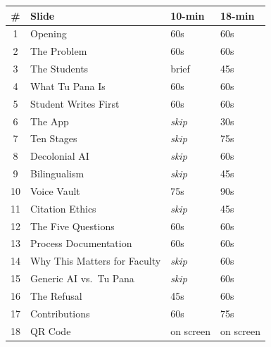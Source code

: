 \documentclass[12pt, letterpaper]{article}
\begin{document}
\vspace{1.5em}
\noindent{\color{tpborder}\rule{\linewidth}{0.5pt}}

\vspace{1.2em}
\vspace{0.5em}

{\small\color{tpdark}
\renewcommand{\arraystretch}{1.35}
\begin{tabular}{clll}
  \color{tpmuted}\textbf{\#} &
  \color{tpmuted}\textbf{Slide} &
  \color{tpmuted}\textbf{10-min} &
  \color{tpmuted}\textbf{18-min} \\
  \hline
  1  & Opening                          & 60s          & 60s \\
  2  & The Problem                      & 60s          & 60s \\
  3  & The Students                     & brief        & 45s \\
  4  & What Tu Pana Is                  & 60s          & 60s \\
  5  & Student Writes First             & 60s          & 60s \\
  6  & The App                          & \textit{skip}& 30s \\
  7  & Ten Stages                       & \textit{skip}& 75s \\
  8  & Decolonial AI                    & \textit{skip}& 60s \\
  9  & Bilingualism                     & \textit{skip}& 45s \\
  10 & Voice Vault                      & 75s          & 90s \\
  11 & Citation Ethics                  & \textit{skip}& 45s \\
  12 & The Five Questions               & 60s          & 60s \\
  13 & Process Documentation            & 60s          & 60s \\
  14 & Why This Matters for Faculty     & \textit{skip}& 60s \\
  15 & Generic AI vs.\ Tu Pana          & \textit{skip}& 60s \\
  16 & The Refusal                      & 45s          & 60s \\
  17 & Contributions                    & 60s          & 75s \\
  18 & QR Code                          & on screen    & on screen \\
\end{tabular}
}
\end{document}
